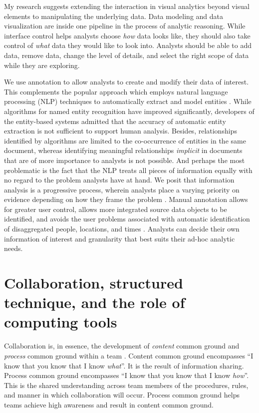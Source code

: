 My research suggests extending the interaction in visual analytics beyond visual elements to manipulating the underlying data. Data modeling and data visualization are inside one pipeline in the process of analytic reasoning. While interface control helps analysts choose \textit{how} data looks like, they should also take  control of \textit{what} data they would like to look into. Analysts should be able to add data, remove data, change the level of details, and select the right scope of data while they are exploring. 

We use annotation to allow analysts to create and modify their data of interest. This complements the popular approach which employs 
natural language processing (NLP) techniques to automatically extract and
model entities \citep{Bier2010, Stasko2008}. While algorithms for named
entity recognition have improved significantly, developers of the
entity-based systems \citep{Gorg2014} admitted that the
accuracy of automatic entity extraction is not sufficient to support
human analysis. Besides, relationships identified by algorithms are
limited to the co-occurrence of entities in the same document, whereas
identifying meaningful relationships \emph{implicit} in documents that
are of more importance to analysts is not possible. And perhaps the most
problematic is the fact that the NLP treats all pieces of information
equally with no regard to the problem analysts have at hand. We posit
that information analysis is a progressive process, wherein analysts
place a varying priority on evidence depending on how they frame the
problem \citep{Heuer1999}. Manual annotation allows for greater user
control, allows more integrated source data objects to be identified,
and avoids the user problems associated with automatic identification of
disaggregated people, locations, and times \citep{Bier2008}. Analysts can
decide their own information of interest and granularity that best suits
their ad-hoc analytic needs.

\section{Collaboration, structured technique, and the role of computing tools}

Collaboration is, in essence, the development of \textit{content} common ground and \textit{process} common ground within a team \citep{Convertino2009}. Content common ground encompasses ``I know that you know that I know \textit{what}''. It is the result of information sharing. Process common ground encompasses ``I know that you know that I know \textit{how}''. This is the shared understanding across team members of the procedures, rules, and manner in which collaboration will occur. Process common ground helps teams achieve high awareness and result in content common ground.

